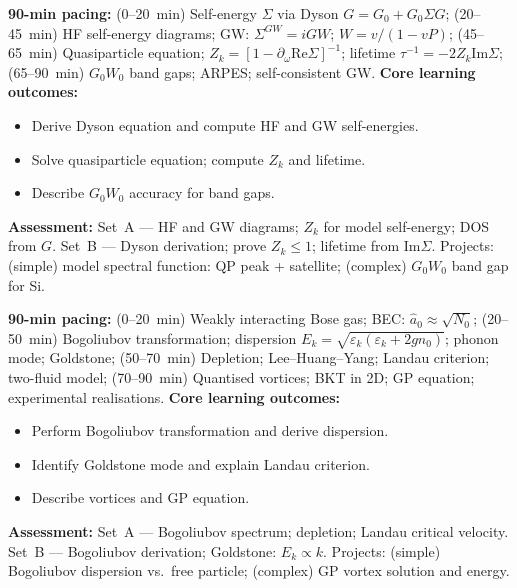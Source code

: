 \documentclass[11pt,a4paper]{article}
\begin{document}
\medskip

\begin{tcolorbox}[modulebox, title={Module~II.4 --- Lecture L07: Green's Functions II --- Dyson Equation}]
\textbf{90-min pacing:} (0--20~min) Self-energy $\Sigma$ via Dyson $G=G_0+G_0\Sigma G$; (20--45~min) HF self-energy diagrams; GW: $\Sigma^{GW}=iGW$; $W=v/(1-vP)$; (45--65~min) Quasiparticle equation; $Z_k=[1-\partial_\omega\text{Re}\Sigma]^{-1}$; lifetime $\tau^{-1}=-2Z_k\text{Im}\Sigma$; (65--90~min) $G_0W_0$ band gaps; ARPES; self-consistent GW.
\medskip\textbf{Core learning outcomes:}
\begin{itemize}[leftmargin=1.4em,topsep=2pt,itemsep=1pt]
  \item Derive Dyson equation and compute HF and GW self-energies.
  \item Solve quasiparticle equation; compute $Z_k$ and lifetime.
  \item Describe $G_0W_0$ accuracy for band gaps.
\end{itemize}
\medskip\textbf{Assessment:}
Set~A --- HF and GW diagrams; $Z_k$ for model self-energy; DOS from $G$.
Set~B --- Dyson derivation; prove $Z_k\leq1$; lifetime from Im$\Sigma$.
Projects: (simple) model spectral function: QP peak + satellite; (complex) $G_0W_0$ band gap for Si.
\end{tcolorbox}

\medskip

\begin{tcolorbox}[modulebox, title={Module~II.4 --- Lecture L08: Interacting Bosons and BEC}]
\textbf{90-min pacing:} (0--20~min) Weakly interacting Bose gas; BEC: $\hat{a}_0\approx\sqrt{N_0}$; (20--50~min) Bogoliubov transformation; dispersion $E_k=\sqrt{\varepsilon_k(\varepsilon_k+2gn_0)}$; phonon mode; Goldstone; (50--70~min) Depletion; Lee--Huang--Yang; Landau criterion; two-fluid model; (70--90~min) Quantised vortices; BKT in 2D; GP equation; experimental realisations.
\medskip\textbf{Core learning outcomes:}
\begin{itemize}[leftmargin=1.4em,topsep=2pt,itemsep=1pt]
  \item Perform Bogoliubov transformation and derive dispersion.
  \item Identify Goldstone mode and explain Landau criterion.
  \item Describe vortices and GP equation.
\end{itemize}
\medskip\textbf{Assessment:}
Set~A --- Bogoliubov spectrum; depletion; Landau critical velocity.
Set~B --- Bogoliubov derivation; Goldstone: $E_k\propto k$.
Projects: (simple) Bogoliubov dispersion vs.\ free particle; (complex) GP vortex solution and energy.
\end{tcolorbox}
\end{document}
